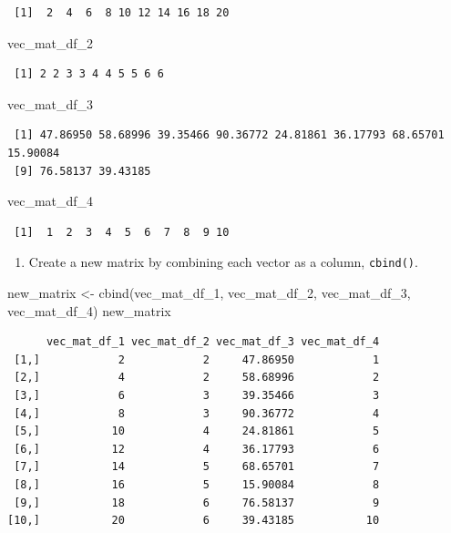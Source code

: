 \documentclass[
  letterpaper,
  DIV=11,
  numbers=noendperiod]{scrreprt}
\newenvironment{Shaded}{\begin{snugshade}}{\end{snugshade}}
\newcommand{\FunctionTok}[1]{\textcolor[rgb]{0.28,0.35,0.67}{#1}}
\newcommand{\NormalTok}[1]{\textcolor[rgb]{0.00,0.23,0.31}{#1}}
\newcommand{\OtherTok}[1]{\textcolor[rgb]{0.00,0.23,0.31}{#1}}
\providecommand{\tightlist}{%
  \setlength{\itemsep}{0pt}\setlength{\parskip}{0pt}}\usepackage{longtable,booktabs,array}
\begin{document}
\begin{verbatim}
 [1]  2  4  6  8 10 12 14 16 18 20
\end{verbatim}

\begin{Shaded}
\begin{Highlighting}[]
\NormalTok{vec\_mat\_df\_2}
\end{Highlighting}
\end{Shaded}

\begin{verbatim}
 [1] 2 2 3 3 4 4 5 5 6 6
\end{verbatim}

\begin{Shaded}
\begin{Highlighting}[]
\NormalTok{vec\_mat\_df\_3}
\end{Highlighting}
\end{Shaded}

\begin{verbatim}
 [1] 47.86950 58.68996 39.35466 90.36772 24.81861 36.17793 68.65701 15.90084
 [9] 76.58137 39.43185
\end{verbatim}

\begin{Shaded}
\begin{Highlighting}[]
\NormalTok{vec\_mat\_df\_4}
\end{Highlighting}
\end{Shaded}

\begin{verbatim}
 [1]  1  2  3  4  5  6  7  8  9 10
\end{verbatim}

\begin{enumerate}
\def\labelenumi{\arabic{enumi}.}
\setcounter{enumi}{1}
\tightlist
\item
  Create a new matrix by combining each vector as a column,
  \texttt{cbind()}.
\end{enumerate}

\begin{Shaded}
\begin{Highlighting}[]
\NormalTok{new\_matrix }\OtherTok{\textless{}{-}} \FunctionTok{cbind}\NormalTok{(vec\_mat\_df\_1, vec\_mat\_df\_2, vec\_mat\_df\_3, vec\_mat\_df\_4)}
\NormalTok{new\_matrix}
\end{Highlighting}
\end{Shaded}

\begin{verbatim}
      vec_mat_df_1 vec_mat_df_2 vec_mat_df_3 vec_mat_df_4
 [1,]            2            2     47.86950            1
 [2,]            4            2     58.68996            2
 [3,]            6            3     39.35466            3
 [4,]            8            3     90.36772            4
 [5,]           10            4     24.81861            5
 [6,]           12            4     36.17793            6
 [7,]           14            5     68.65701            7
 [8,]           16            5     15.90084            8
 [9,]           18            6     76.58137            9
[10,]           20            6     39.43185           10
\end{verbatim}
\end{document}
